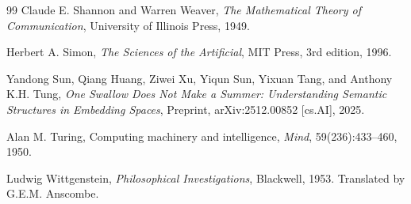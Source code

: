 \documentclass[11pt, twoside]{article}
\theoremstyle{plain}
\theoremstyle{definition}
\theoremstyle{remark}
\begin{document}
\begin{thebibliography}{99}
Claude E. Shannon and Warren Weaver,
\newblock \emph{The Mathematical Theory of Communication},
\newblock University of Illinois Press, 1949.

Herbert A. Simon,
\newblock \emph{The Sciences of the Artificial},
\newblock MIT Press, 3rd edition, 1996.

Yandong Sun, Qiang Huang, Ziwei Xu, Yiqun Sun, Yixuan Tang, and Anthony K.H. Tung,
\newblock \emph{One Swallow Does Not Make a Summer: Understanding Semantic Structures in Embedding Spaces},
\newblock Preprint, arXiv:2512.00852 [cs.AI], 2025.

Alan M. Turing,
\newblock Computing machinery and intelligence,
\newblock \emph{Mind}, 59(236):433--460, 1950.

Ludwig Wittgenstein,
\newblock \emph{Philosophical Investigations},
\newblock Blackwell, 1953.
\newblock Translated by G.E.M. Anscombe.

\end{thebibliography}
\end{document}
